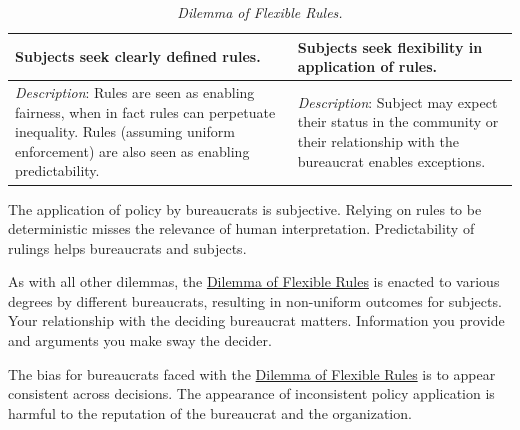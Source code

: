\begin{center}
\begin{table}[H] %
\begin{tabular}{ | m{\dilemmatablewidth}| m{\dilemmatablewidth} | } 
  \hline
  \textbf{Subjects seek clearly defined rules.} &
  \textbf{Subjects seek flexibility in application of rules.} \\
  \hline
  \textit{Description}: Rules are seen as enabling fairness, when in fact rules can perpetuate inequality. Rules (assuming uniform enforcement) are also seen as enabling predictability. & 
  \textit{Description}: Subject may expect their status in the community or their relationship with the bureaucrat enables exceptions. \\
  \hline
\end{tabular}
\caption{\textit{Dilemma of Flexible Rules.}
}
\label{table:dilemma-subject-flexibility}
\end{table}
\end{center}

The application of policy by bureaucrats is subjective. Relying on rules to be deterministic misses the relevance of human interpretation. Predictability of rulings helps bureaucrats and subjects.

As with all other dilemmas, the \hyperref[table:dilemma-subject-flexibility]{Dilemma of Flexible Rules} is enacted to various degrees by different bureaucrats, resulting in non-uniform outcomes for subjects. Your relationship with the deciding bureaucrat matters. Information you provide and arguments you make sway the decider. 

The bias for bureaucrats faced with the \hyperref[table:dilemma-subject-flexibility]{Dilemma of Flexible Rules} is to appear consistent across decisions. The appearance of inconsistent policy application is harmful to the reputation of the bureaucrat and the organization.

